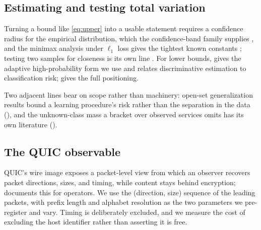 \subsection{Estimating and testing total variation}
\label{sec:background/tv_est}

Turning a bound like \eqref{eq:upper} into a usable statement requires a
confidence radius for the empirical distribution, which the confidence-band
family supplies \citep{wei2011dkwtwo,reeve2024dkwmassart}, and the minimax
analysis under $\ell_1$ loss gives the tightest known constants
\citep{han2015l1distribution,jiao2018l1distance}; testing two samples for
closeness is its own line \citep{chan2013closeness,diakonikolas2020highprob}.
For lower bounds, \citet{michel2020high} gives the adaptive high-probability form
we use and \citet{tao2024discriminative} relates discriminative estimation to
classification risk;  gives the full positioning.

Two adjacent lines bear on scope rather than machinery: open-set generalization
results \citep{fang2021learning,garov2025closer} bound a learning procedure's risk
rather than the separation in the data (), and the
unknown-class mass a bracket over observed services omits has its own literature
\citep{orlitsky2016optimal,eriksson2026unseen}
().

\subsection{The QUIC observable}
\label{sec:background/quic}

QUIC's wire image exposes a packet-level view from which an observer recovers
packet directions, sizes, and timing, while content stays behind encryption;
\citet{kuhlewind2022rfc} documents this for operators. We use the
(direction, size) sequence of the leading packets, with prefix length and
alphabet resolution as the two parameters we pre-register and vary. Timing is
deliberately excluded, and we measure the cost of excluding the host identifier
rather than asserting it is free.
